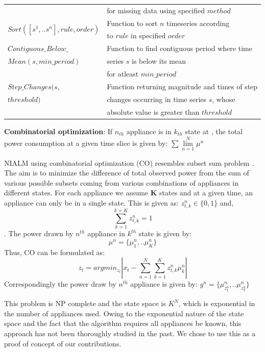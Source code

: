 \documentclass[conference]{IEEEtran}
\begin{document}
\begin{table}
\begin{tabular}{|l|l|}
                                        &for missing data using specified $method$\\
\multirow{2}{*}{$Sort([s^1,..s^n],rule,order)$} & Function to sort $n$ timeseries according\\
                                        &to $rule$ in specified $order$\\
$Contiguous\_Below\_$ & Function to find contiguous period where time \\
$Mean(s,min\_period)$                  &series $s$ is below its mean \\
                                       &for atleast $min\_period$\\
$Step\_Changes(s,$ & Function returning magnitude and times of step\\
$threshold)$                  &changes occurring in time series $s$, whose \\
                              &absolute value is greater than $threshold$\\                                                                       
                                                                               

\hline
%
\end{tabular}
\end{table}

\textbf{Combinatorial optimization}: If $n_{th}$ appliance is in $k_{th}$ state at , the total power consumption at a given time slice is given by:
$\sum\lim\limits_{n=1}^{N}\mu^n$
		

NIALM using combinatorial optimization (CO) resembles subset sum problem \cite{knapsack}. 
The aim is to minimize the difference of total observed power from the sum of various possible subsets coming from various combinations of appliances in different states. For each appliance we assume \textbf{K} states and at a given time, an appliance can only be in a single state. This is given as: 
$z_{t,k}^n\in\{0,1\} $ and, $$\sum\limits_{k=1}^{k=K} z_{t,k}^n=1$$. The power drawn by $n^{th}$ appliance in $k^{th}$ state is given by:
$$\mu^n=\{\mu_1^n,..\mu_K^n\}$$ Thus, CO can be formulated as:
$$z_t=arg min_{z_t}|x_t-\sum\limits_{n=1}^{N}\sum\limits_{k=1}^{K}z_{t,k}^n\mu_k^n|$$
Correspondingly the power draw by $n^{th}$ appliance is given by: $y^n=\{\mu_{z_1^n}^n,..\mu_{z_T^n}^n \}$

This problem is NP complete and the state space is $K^N$, which is exponential in the number of appliances used. Owing to the exponential nature of the state space and the fact that the algorithm requires all appliances be known, this approach has not been thoroughly studied in the past. We chose to use this as a proof of concept of our contributions.
\end{document}
